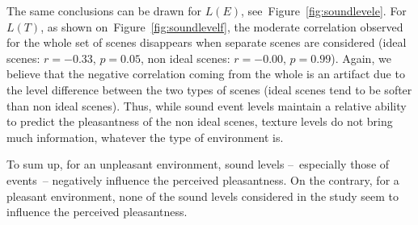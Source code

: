 \documentclass[12pt]{elsarticle}
\newcommand{\ie}{\emph{i.\,e.}}
\newcommand{\cf}{cf.}
\begin{document}

The same conclusions can be drawn for $L(E)$, see~Figure~\ref{fig:soundlevele}. For $L(T)$, as shown on~Figure~\ref{fig:soundlevelf}, the moderate correlation observed for the whole set of scenes disappears when separate scenes are considered (ideal scenes: $r=-0.33$, $p=0.05$, non ideal scenes: $r=-0.00$, $p=0.99$). Again, we believe that the negative correlation coming from the whole is an artifact due to the level difference between the two types of scenes (ideal scenes tend to be softer than non ideal scenes). Thus, while sound event levels maintain a relative ability to predict the pleasantness of the non ideal scenes, texture levels do not bring much information, whatever the type of environment is.


To sum up, for an unpleasant environment, sound levels --~especially those of events~-- negatively influence the perceived pleasantness. On the contrary, for a pleasant environment, none of the sound levels considered in the study seem to influence the perceived pleasantness.

%
\end{document}
